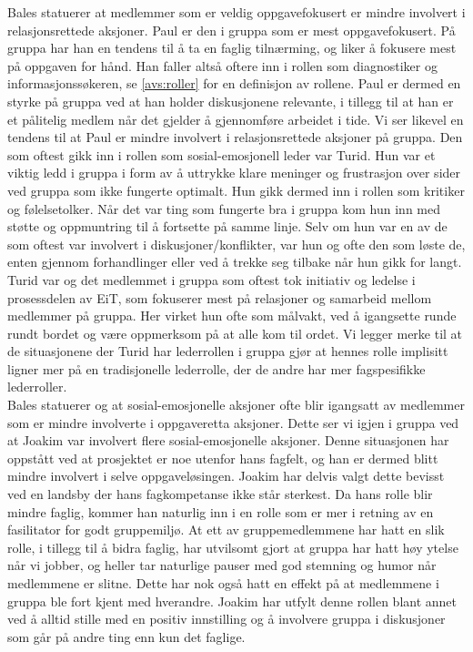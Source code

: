 Bales statuerer at medlemmer som er veldig oppgavefokusert er mindre involvert i 
relasjonsrettede aksjoner. Paul er den i gruppa som er mest oppgavefokusert. 
På gruppa har han en tendens til å ta en faglig tilnærming, og liker å fokusere mest 
på oppgaven for hånd. Han faller altså oftere inn i rollen som diagnostiker og 
informasjonssøkeren, se \cref{avs:roller} for en definisjon av rollene. Paul er dermed en styrke på gruppa ved at han holder 
diskusjonene relevante, i tillegg til at han er et pålitelig medlem når det gjelder 
å gjennomføre arbeidet i tide. Vi ser likevel en tendens til at Paul er mindre involvert 
i relasjonsrettede aksjoner på gruppa. 
Den som oftest gikk inn i rollen som sosial-emosjonell leder var Turid. Hun var et viktig 
ledd i gruppa i form av å uttrykke klare meninger og frustrasjon over sider ved gruppa
som ikke fungerte optimalt. Hun gikk dermed inn i rollen som kritiker og følelsetolker.
Når det var ting som fungerte bra i gruppa kom hun inn med støtte og oppmuntring til å 
fortsette på samme linje. Selv om hun var en av de som oftest var involvert i diskusjoner/konflikter,
var hun og ofte den som løste de, enten gjennom forhandlinger eller ved å trekke seg tilbake
når hun gikk for langt. Turid var og det medlemmet i gruppa som oftest tok initiativ og ledelse 
i prosessdelen av EiT, som fokuserer mest på relasjoner og samarbeid mellom medlemmer på gruppa. 
Her virket hun ofte som målvakt, ved å igangsette runde rundt bordet og være oppmerksom på 
at alle kom til ordet. Vi legger merke til at de situasjonene der Turid har
lederrollen i gruppa gjør at hennes rolle implisitt ligner mer på en tradisjonelle lederrolle, der de
andre har mer fagspesifikke lederroller. \\

Bales statuerer og at sosial-emosjonelle aksjoner ofte blir igangsatt av medlemmer som er 
mindre involverte i oppgaveretta aksjoner. Dette ser vi igjen i gruppa ved at Joakim var 
involvert flere sosial-emosjonelle aksjoner. Denne situasjonen har oppstått ved at prosjektet 
er noe utenfor hans fagfelt, og han er dermed blitt mindre involvert i selve oppgaveløsingen. 
Joakim har delvis valgt dette bevisst ved en landsby der hans fagkompetanse ikke
står sterkest. Da hans rolle blir mindre faglig, kommer han naturlig inn i en
rolle som er mer i retning av en fasilitator for godt gruppemiljø. At ett av
gruppemedlemmene har hatt en slik rolle, i tillegg til å bidra faglig, har
utvilsomt gjort at gruppa har hatt høy ytelse når vi jobber, og heller tar
naturlige pauser med god stemning og humor når medlemmene er slitne. Dette har
nok også hatt en effekt på at medlemmene i gruppa ble fort kjent med hverandre.
Joakim har utfylt denne rollen blant annet ved å alltid stille med en positiv innstilling og 
å involvere gruppa i diskusjoner som går på andre ting enn kun det faglige.\\

